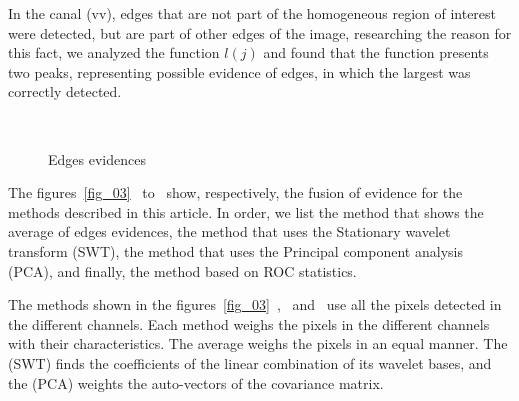 \documentclass[conference]{IEEEtran}
\begin{document}
In the canal (vv), edges that are not part of the homogeneous region of interest were detected, but are part of other edges of the image, researching the reason for this fact, we analyzed the function $l(j)$ and found that the function presents two peaks, representing possible evidence of edges, in which the largest was correctly detected. 
   \begin{figure}[!ht]
     \hfill
     \\
     \centering
     \caption{Edges evidences}
     \label{fig_02}
   \end{figure}

The figures~\ref{fig_03}~ to~ show, respectively, the fusion of evidence for the methods described in this article. In order, we list the method that shows the average of edges evidences, the method that uses the Stationary wavelet transform (SWT), the method that uses the Principal component analysis (PCA), and finally, the method based on ROC statistics.

The methods shown in the figures~\ref{fig_03}~,~ and~ use all the pixels detected in the different channels. Each method weighs the pixels in the different channels with their characteristics. The average weighs the pixels in an equal manner. The (SWT) finds the coefficients of the linear combination of its wavelet bases, and the (PCA) weights the auto-vectors of the covariance matrix.
\end{document}
